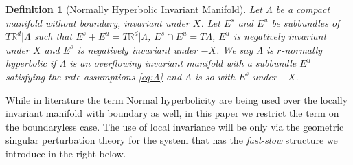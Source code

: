 \documentclass[usletter,11pt]{article}
\def\blue{\color{blue}}
\newtheorem{definition}{Definition}[section]
\theoremstyle{remark}
\begin{document}
\begin{definition}[Normally Hyperbolic Invariant Manifold] \label{def:nhim}
 Let $\Lambda$ be a compact manifold without boundary, invariant under $X$. Let $E^s$ and $E^u$ be subbundles of $T \mathbb{R}^d|\Lambda$ such that $E^s + E^u = T \mathbb{R}^d|\Lambda$, $E^s\cap E^u=T\Lambda$, $E^u$ is negatively invariant under $X$ and $E^s$ is negatively invariant under $-X$. 
 We say $\Lambda$ is $r$-normally hyperbolic if $\Lambda$ is an overflowing invariant manifold with a subbundle $E^u$ satisfying the rate assumptions \eqref{eq:A} and $\Lambda$ is so with $E^s$ under $-X$. 
\end{definition}
{\blue While in literature the term Normal hyperbolicity are being used over the locally invariant manifold with boundary as well, in this paper we restrict the term on the boundaryless case. The use of local invariance  will be only via the geometric singular perturbation theory for the system that has the {\it fast-slow} structure we introduce in the right below. }%
\end{document}

